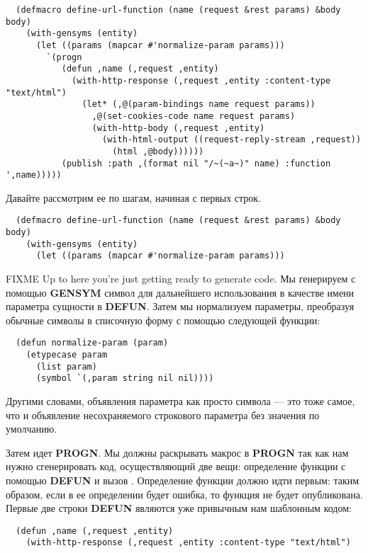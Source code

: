 \begin{lstlisting}
  (defmacro define-url-function (name (request &rest params) &body body)
    (with-gensyms (entity)
      (let ((params (mapcar #'normalize-param params)))
        `(progn
           (defun ,name (,request ,entity)
             (with-http-response (,request ,entity :content-type "text/html")
               (let* (,@(param-bindings name request params))
                 ,@(set-cookies-code name request params)
                 (with-http-body (,request ,entity)
                   (with-html-output ((request-reply-stream ,request))
                     (html ,@body))))))
           (publish :path ,(format nil "/~(~a~)" name) :function ',name)))))
\end{lstlisting}

Давайте рассмотрим ее по шагам, начиная с первых строк.

\begin{lstlisting}
  (defmacro define-url-function (name (request &rest params) &body body)
    (with-gensyms (entity)
      (let ((params (mapcar #'normalize-param params)))
\end{lstlisting}

FIXME Up to here you're just getting ready to generate code. Мы генерируем с помощью
\textbf{GENSYM} символ для дальнейшего использования в качестве имени параметра сущности в
\textbf{DEFUN}. Затем мы нормализуем параметры, преобразуя обычные символы в списочную
форму с помощью следующей функции:

\begin{lstlisting}
  (defun normalize-param (param)
    (etypecase param
      (list param)
      (symbol `(,param string nil nil))))
\end{lstlisting}

Другими словами, объявления параметра как просто символа --- это тоже самое, что и
объявление несохраняемого строкового параметра без значения по умолчанию.

Затем идет \textbf{PROGN}. Мы должны раскрывать макрос в \textbf{PROGN} так как нам нужно
сгенерировать код, осуществляющий две вещи: определение функции с помощью \textbf{DEFUN} и
вызов . Определение функции должно идти первым: таким образом, если в ее
определении будет ошибка, то функция не будет опубликована. Первые две строки
\textbf{DEFUN} являются уже привычным нам шаблонным кодом:

\begin{lstlisting}
  (defun ,name (,request ,entity)
    (with-http-response (,request ,entity :content-type "text/html")  
\end{lstlisting}

